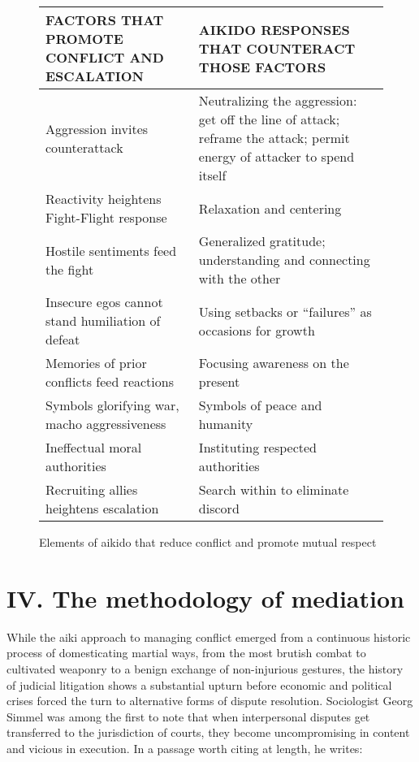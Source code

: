 \begin{figure}
\caption{Elements of aikido that reduce conflict and promote mutual respect}
\centering
\begin{tabular}{ | C{.5\textwidth} | C{.5\textwidth} | }
\hline
\bfseries\uppercase{Factors That Promote Conflict and Escalation} & \bfseries\uppercase{Aikido Responses That Counteract Those Factors} \\
\hline
Aggression invites counterattack  & Neutralizing the aggression: get off the line of attack; reframe the attack; permit energy of attacker to spend itself \\
\hline
Reactivity heightens Fight-Flight response & Relaxation and centering \\
\hline
Hostile sentiments feed the fight & Generalized gratitude; understanding and connecting with the other \\
\hline
Insecure egos cannot stand humiliation of defeat & Using setbacks or ``failures'' as occasions for growth \\
\hline
Memories of prior conflicts feed reactions & Focusing awareness on the present \\
\hline
Symbols glorifying war, macho aggressiveness & Symbols of peace and humanity \\
\hline
Ineffectual moral authorities & Instituting respected authorities \\
\hline
Recruiting allies heightens escalation & Search within to eliminate discord \\
\hline
\end{tabular}
\end{figure}

\section*{IV. The methodology of mediation}

While the aiki approach to managing conflict emerged from a continuous historic process of domesticating martial ways, from the most brutish combat to cultivated weaponry to a benign exchange of non-injurious gestures, the history of judicial litigation shows a substantial upturn before economic and political crises forced the turn to alternative forms of dispute resolution. Sociologist Georg Simmel was among the first to note that when interpersonal disputes get transferred to the jurisdiction of courts, they become uncompromising in content and vicious in execution. In a passage worth citing at length, he writes:

